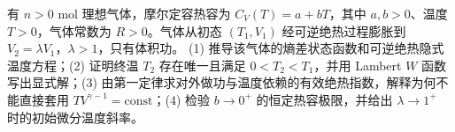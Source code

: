 有 \(n>0\) mol 理想气体，摩尔定容热容为 \(C_V(T)=a+bT\)，其中 \(a,b>0\)、温度 \(T>0\)，气体常数为 \(R>0\)。气体从初态 \((T_1,V_1)\) 经可逆绝热过程膨胀到 \(V_2=\lambda V_1\)，\(\lambda>1\)，只有体积功。
(1) 推导该气体的熵差状态函数和可逆绝热隐式温度方程；(2) 证明终温 \(T_2\) 存在唯一且满足 \(0<T_2<T_1\)，并用 Lambert \(W\) 函数写出显式解；(3) 由第一定律求对外做功与温度依赖的有效绝热指数，解释为何不能直接套用 \(TV^{\gamma-1}=\mathrm{const}\)；(4) 检验 \(b\to0^+\) 的恒定热容极限，并给出 \(\lambda\to1^+\) 时的初始微分温度斜率。
